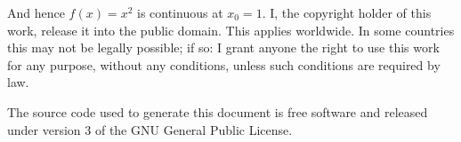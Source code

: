 \documentclass{article}
\theoremstyle{normal}
\begin{document}
    And hence $f(x)=x^{2}$ is continuous at $x_{0}=1$.
    \newpage
    I, the copyright holder of this work, release it into the public domain.
    This applies worldwide. In some countries this may not be legally possible;
    if so: I grant anyone the right to use this work for any purpose, without
    any conditions, unless such conditions are required by law.
    \par\hfill\par
    The source code used to generate this document is free software and released
    under version 3 of the GNU General Public License.
\end{document}
